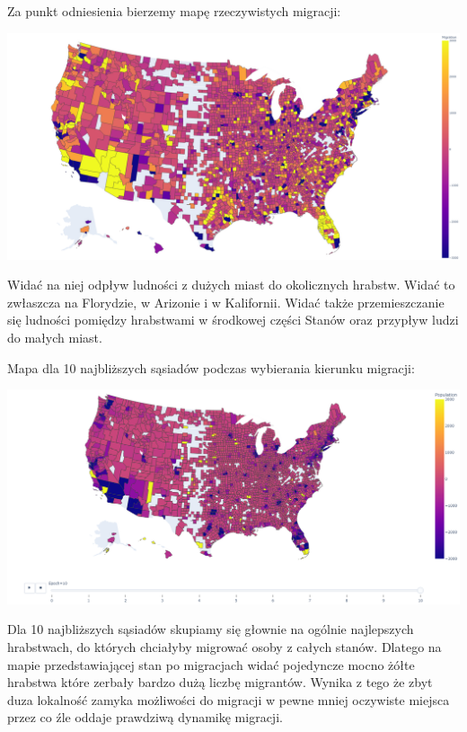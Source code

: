 \documentclass[a4paper,12pt]{article}
\begin{document}
Za punkt odniesienia bierzemy mapę rzeczywistych migracji:
\begin{center}
    \includegraphics*[width=15cm]{./pictures/real_population.png}
\end{center}
Widać na niej odpływ ludności z dużych miast do okolicznych hrabstw. Widać to zwłaszcza na Florydzie, w Arizonie i w Kalifornii. Widać także przemieszczanie się ludności pomiędzy hrabstwami w środkowej części Stanów oraz przypływ ludzi do małych miast.


Mapa dla 10 najbliższych sąsiadów podczas wybierania kierunku migracji:
\begin{center}
    \includegraphics*[width=15cm]{./pictures/population_k10.png}
\end{center}


Dla 10 najbliższych sąsiadów skupiamy się głownie na ogólnie najlepszych hrabstwach, do których chciałyby migrować osoby z całych stanów. Dlatego na mapie przedstawiającej stan po migracjach widać pojedyncze mocno żółte hrabstwa które zerbały bardzo dużą liczbę migrantów. Wynika z tego że zbyt duza lokalność zamyka możliwości do migracji w pewne mniej oczywiste miejsca przez co źle oddaje prawdziwą dynamikę migracji.
\end{document}
